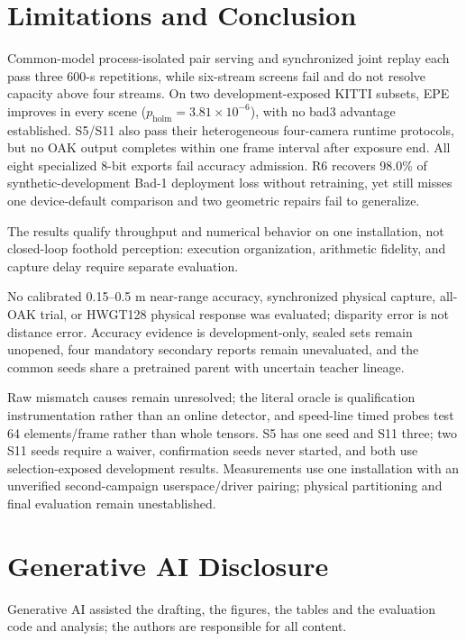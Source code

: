 \documentclass[sigconf,review,anonymous]{acmart}
\begin{document}
\section{Limitations and Conclusion}
Common-model process-isolated pair serving and synchronized joint replay each pass three 600-s repetitions, while six-stream screens fail and do not resolve capacity above four streams. On two development-exposed KITTI subsets, EPE improves in every scene ($p_{\mathrm{holm}}=3.81\times10^{-6}$), with no bad3 advantage established. S5/S11 also pass their heterogeneous four-camera runtime protocols, but no OAK output completes within one frame interval after exposure end. All eight specialized 8-bit exports fail accuracy admission. R6 recovers 98.0\% of synthetic-development Bad-1 deployment loss without retraining, yet still misses one device-default comparison and two geometric repairs fail to generalize.

The results qualify throughput and numerical behavior on one installation, not closed-loop foothold perception: execution organization, arithmetic fidelity, and capture delay require separate evaluation.

No calibrated 0.15--0.5 m near-range accuracy, synchronized physical capture, all-OAK trial, or HWGT128 physical response was evaluated; disparity error is not distance error. Accuracy evidence is development-only, sealed sets remain unopened, four mandatory secondary reports remain unevaluated, and the common seeds share a pretrained parent with uncertain teacher lineage.

Raw mismatch causes remain unresolved; the literal oracle is qualification instrumentation rather than an online detector, and speed-line timed probes test 64 elements/frame rather than whole tensors. S5 has one seed and S11 three; two S11 seeds require a waiver, confirmation seeds never started, and both use selection-exposed development results. Measurements use one installation with an unverified second-campaign userspace/driver pairing; physical partitioning and final evaluation remain unestablished.

\section*{Generative AI Disclosure}
Generative AI assisted the drafting, the figures, the tables and the evaluation code and analysis;
the authors are responsible for all content.\label{mmsys:body-end}

\end{document}
